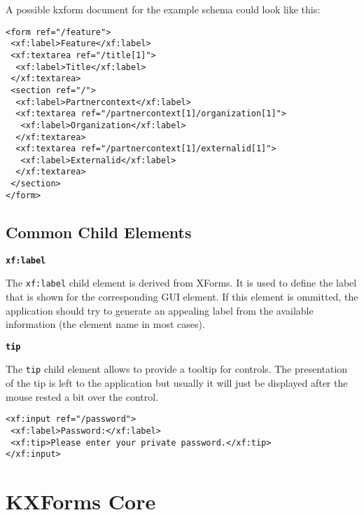 \begin{description}
A possible kxform document for the example schema could look like this:


\begin{lstlisting}[caption=Example KXForms Document]
<form ref="/feature">
 <xf:label>Feature</xf:label>
 <xf:textarea ref="/title[1]">
  <xf:label>Title</xf:label>
 </xf:textarea>
 <section ref="/">
  <xf:label>Partnercontext</xf:label>
  <xf:textarea ref="/partnercontext[1]/organization[1]">
   <xf:label>Organization</xf:label>
  </xf:textarea>
  <xf:textarea ref="/partnercontext[1]/externalid[1]">
   <xf:label>Externalid</xf:label>
  </xf:textarea>
 </section>
</form>
\end{lstlisting}

\end{description}



\subsection{ Common Child Elements}
\label{commonchildelements}
\begin{description}
 \item \textbf{\texttt{xf:label}} 

The \texttt{xf:label} child element is derived from XForms. It is used to define the label that is shown for the corresponding GUI element. If this element is ommitted, the application should try to generate an appealing label from the available information (the element name in most cases).


 \item \textbf{\texttt{tip}} 

The \texttt{tip} child element allows to provide a tooltip for controls. The presentation of the tip is left to the application but usually it will just be displayed after the mouse rested a bit over the control.

\begin{lstlisting}[caption=Example KXForms Document]
<xf:input ref="/password">
 <xf:label>Password:</xf:label>
 <xf:tip>Please enter your private password.</xf:tip>
</xf:input>
\end{lstlisting}
\end{description}









\pagebreak 
\section{ KXForms Core}

